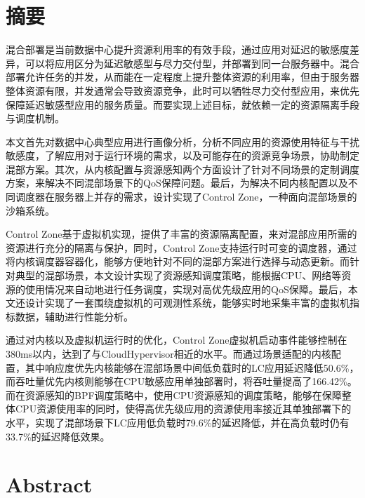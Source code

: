 
\maketitle%
\MAKETITLE%
\makedeclaration%
\intobmk\chapter*{摘\quad 要}%
\setcounter{page}{1}%


混合部署是当前数据中心提升资源利用率的有效手段，通过应用对延迟的敏感度差异，可以将应用区分为延迟敏感型与尽力交付型，并部署到同一台服务器中。混合部署允许任务的并发，从而能在一定程度上提升整体资源的利用率，但由于服务器整体资源有限，并发通常会导致资源竞争，此时可以牺牲尽力交付型应用，来优先保障延迟敏感型应用的服务质量。而要实现上述目标，就依赖一定的资源隔离手段与调度机制。

本文首先对数据中心典型应用进行画像分析，分析不同应用的资源使用特征与干扰敏感度，了解应用对于运行环境的需求，以及可能存在的资源竞争场景，协助制定混部方案。其次，从内核配置与资源感知两个方面设计了针对不同场景的定制调度方案，来解决不同混部场景下的QoS保障问题。最后，为解决不同内核配置以及不同调度器在服务器上并存的需求，设计实现了Control Zone，一种面向混部场景的沙箱系统。

Control Zone基于虚拟机实现，提供了丰富的资源隔离配置，来对混部应用所需的资源进行充分的隔离与保护，同时，Control Zone支持运行时可变的调度器，通过将内核调度器容器化，能够方便地针对不同的混部方案进行选择与动态更新。而针对典型的混部场景，本文设计实现了资源感知调度策略，能根据CPU、网络等资源的使用情况来自动地进行任务调度，实现对高优先级应用的QoS保障。最后，本文还设计实现了一套围绕虚拟机的可观测性系统，能够实时地采集丰富的虚拟机指标数据，辅助进行性能分析。


通过对内核以及虚拟机运行时的优化，Control Zone虚拟机启动事件能够控制在380ms以内，达到了与CloudHypervisor相近的水平。而通过场景适配的内核配置，其中响应度优先内核能够在混部场景中间低负载时的LC应用延迟降低50.6\%，而吞吐量优先内核则能够在CPU敏感应用单独部署时，将吞吐量提高了166.42\%。而在资源感知的BPF调度策略中，使用CPU资源感知的调度策略，能够在保障整体CPU资源使用率的同时，使得高优先级应用的资源使用率接近其单独部署下的水平，实现了混部场景下LC应用低负载时79.6\%的延迟降低，并在高负载时仍有33.7\%的延迟降低效果。


\intobmk\chapter*{Abstract}%



\KEYWORDS{}%

\pagestyle{enfrontmatterstyle}%
\cleardoublepage\pagestyle{frontmatterstyle}%

